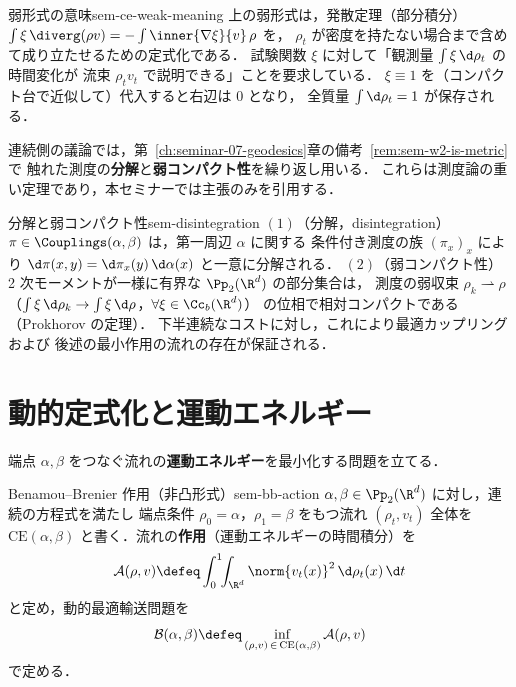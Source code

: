 \begin{remark}{弱形式の意味}{sem-ce-weak-meaning}
  上の弱形式は，発散定理（部分積分）
  $\int \xi\,\diverg(\rho v) = -\int \inner{\nabla\xi}{v}\,\rho$ を，
  $\rho_t$ が密度を持たない場合まで含めて成り立たせるための定式化である．
  試験関数 $\xi$ に対して「観測量 $\int\xi\,\d\rho_t$ の時間変化が
  流束 $\rho_t v_t$ で説明できる」ことを要求している．
  $\xi \equiv 1$ を（コンパクト台で近似して）代入すると右辺は $0$ となり，
  全質量 $\int \d\rho_t = 1$ が保存される．
\end{remark}

連続側の議論では，第~\ref{ch:seminar-07-geodesics}章の備考~\ref{rem:sem-w2-is-metric}で
触れた測度の\textbf{分解}と\textbf{弱コンパクト性}を繰り返し用いる．
これらは測度論の重い定理であり，本セミナーでは主張のみを引用する．

\begin{claim}{分解と弱コンパクト性}{sem-disintegration}
  $(1)$（分解，disintegration）
  $\pi \in \Couplings(\alpha,\beta)$ は，第一周辺 $\alpha$ に関する
  条件付き測度の族 $(\pi_x)_{x}$ により
  $\d\pi(x,y) = \d\pi_x(y)\,\d\alpha(x)$ と一意に分解される．
  $(2)$（弱コンパクト性）
  2 次モーメントが一様に有界な $\Pp_2(\R^d)$ の部分集合は，
  測度の弱収束 $\rho_k \rightharpoonup \rho$
  （$\int \xi\,\d\rho_k \to \int \xi\,\d\rho$，$\forall \xi \in \Cc_b(\R^d)$）
  の位相で相対コンパクトである（Prokhorov の定理）．
  下半連続なコストに対し，これにより最適カップリングおよび
  後述の最小作用の流れの存在が保証される．
\end{claim}

\section{動的定式化と運動エネルギー}
\label{sec:sem-bb-dynamic}

端点 $\alpha,\beta$ をつなぐ流れの\textbf{運動エネルギー}を最小化する問題を立てる．

\begin{definition}{Benamou--Brenier 作用（非凸形式）}{sem-bb-action}
  $\alpha,\beta \in \Pp_2(\R^d)$ に対し，連続の方程式を満たし
  端点条件 $\rho_0=\alpha$，$\rho_1=\beta$ をもつ流れ $(\rho_t,v_t)$ 全体を
  $\mathrm{CE}(\alpha,\beta)$ と書く．流れの\textbf{作用}（運動エネルギーの時間積分）を
  \[
    \mathcal{A}(\rho,v)
    \defeq
    \int_0^1 \!\! \int_{\R^d} \norm{v_t(x)}^2 \,\d\rho_t(x)\,\d t
  \]
  と定め，動的最適輸送問題を
  \[
    \mathcal{B}(\alpha,\beta)
    \defeq
    \inf_{(\rho,v)\,\in\,\mathrm{CE}(\alpha,\beta)} \mathcal{A}(\rho,v)
  \]
  で定める．
\end{definition}

